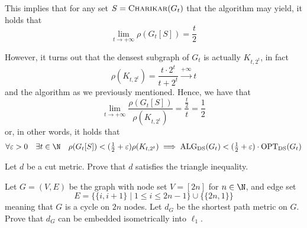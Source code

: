 \documentclass[a4paper, 12pt]{report}
\begin{document}
{        This implies that for any set $S = \textsc{Charikar}(G_t)$ that the algorithm may yield, it holds that $$\lim_{t \to + \infty}{\rho(G_t[S])} = \dfrac{t}{2}$$

        However, it turns out that the densest subgraph of $G_t$ is actually $K_{t, 2^t}$, in fact $$\rho(K_{t, 2^t}) = \dfrac{t \cdot 2^t}{t + 2^t} \stackrel{+\infty}{\longrightarrow} t$$ and the algorithm  as we previously mentioned. Hence, we have that $$\lim_{t \to + \infty}{\dfrac{\rho(G_t[S])}{\rho(K_{t, 2^t})}} = \dfrac{\tfrac{t}{2}}{t} = \dfrac{1}{2}$$ or, in other words, it holds that $$\forall \varepsilon > 0 \quad \exists t \in \N \quad \rho(G_t[S]) < (\tfrac{1}{2} + \varepsilon) \rho(K_{t, 2^t}) \implies \mathrm{ALG_{DS}}(G_t) < (\tfrac{1}{2} + \varepsilon) \cdot \mathrm{OPT_{DS}}(G_t)$$
    }

    \begin{framedprob}{}
        Let $d$ be a cut metric. Prove that $d$ satisfies the triangle inequality.
    \end{framedprob}


    \begin{framedprob}{}
        Let $G = (V, E)$ be the graph with node set $V = [2n]$ for $n \in \N$, and edge set $$E = \{\{i, i + 1\} \mid 1 \le i \le 2n - 1\} \cup \{\{2n, 1\}\}$$ meaning that $G$ is a cycle on $2n$ nodes. Let $d_G$ be the shortest path metric on $G$. Prove that $d_G$ can be embedded isometrically into $\ell_1$.
    \end{framedprob}
\end{document}
